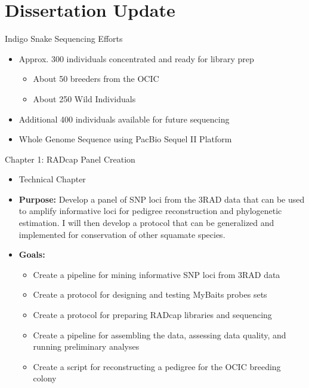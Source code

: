 \documentclass[10pt,aspectratio=169]{beamer}
\begin{document}
\section[Dissertation Status]{Dissertation Update}

\begin{frame}[fragile]{Indigo Snake Sequencing Efforts}
\begin{itemize}
  \item Approx. 300 individuals concentrated and ready for library prep
  \begin{itemize}
    \item About 50 breeders from the OCIC
    \item About 250 Wild Individuals
  \end{itemize}
  \item Additional 400 individuals available for future sequencing
  \item Whole Genome Sequence using PacBio Sequel II Platform
\end{itemize}
\end{frame}

\begin{frame}{Chapter 1: RADcap Panel Creation}
  \begin{itemize}
      \item Technical Chapter
      \item \textbf{Purpose:} Develop a panel of SNP loci from the 3RAD data that can be used to amplify informative loci for pedigree reconstruction and phylogenetic estimation. I will then develop a protocol that can be generalized and implemented for conservation of other squamate species. 

      \item \textbf{Goals:}
      \begin{itemize}
        \item Create a pipeline for mining informative SNP loci from 3RAD data
        \item Create a protocol for designing and testing MyBaits probes sets 
        \item Create a protocol for preparing RADcap libraries and sequencing 
        \item Create a pipeline for assembling the data, assessing data quality, and running preliminary analyses
        \item Create a script for reconstructing a pedigree for the OCIC breeding colony
      \end{itemize}
  \end{itemize}
\end{frame}
\end{document}
